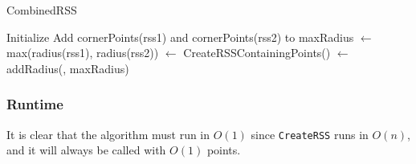 \begin{algorithm}[H]
  \caption{CombinedRSS}
   
  \dontprintsemicolon
  Initialize \points \;
  Add cornerPoints(rss1) and cornerPoints(rss2) to \points \;
  maxRadius $\gets$ max(radius(rss1), radius(rss2)) \;
  \crss $\gets$ CreateRSSContainingPoints(\points) \;
  \crss $\gets$ addRadius(\crss, maxRadius) \;
  \return \crss
\end{algorithm}

\subsubsection{Runtime}
It is clear that the algorithm must run in $O(1)$ since \texttt{CreateRSS} runs in $O(n)$, and it will always be called with $O(1)$ points.

